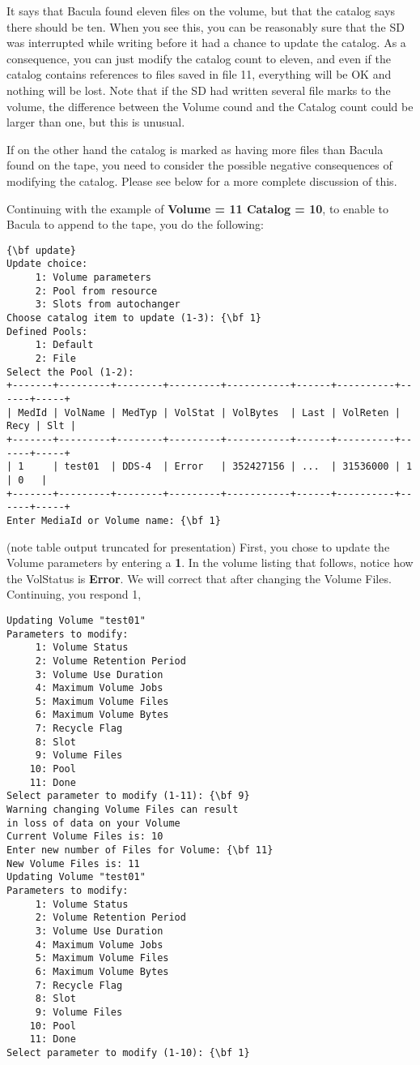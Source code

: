 It says that Bacula found eleven files on the volume, but that the catalog
says there should be ten. When you see this, you can be reasonably sure that
the SD was interrupted while writing before it had a chance to update the
catalog. As a consequence, you can just modify the catalog count to eleven,
and even if the catalog contains references to files saved in file 11,
everything will be OK and nothing will be lost. Note that if the SD had
written several file marks to the volume, the difference between the Volume
cound and the Catalog count could be larger than one, but this is unusual. 

If on the other hand the catalog is marked as having more files than Bacula
found on the tape, you need to consider the possible negative consequences of
modifying the catalog. Please see below for a more complete discussion of
this. 

Continuing with the example of {\bf Volume = 11 Catalog = 10}, to enable to
Bacula to append to the tape, you do the following: 

\footnotesize
\begin{verbatim}
{\bf update}
Update choice:
     1: Volume parameters
     2: Pool from resource
     3: Slots from autochanger
Choose catalog item to update (1-3): {\bf 1}
Defined Pools:
     1: Default
     2: File
Select the Pool (1-2):
+-------+---------+--------+---------+-----------+------+----------+------+-----+
| MedId | VolName | MedTyp | VolStat | VolBytes  | Last | VolReten | Recy | Slt |
+-------+---------+--------+---------+-----------+------+----------+------+-----+
| 1     | test01  | DDS-4  | Error   | 352427156 | ...  | 31536000 | 1    | 0   |
+-------+---------+--------+---------+-----------+------+----------+------+-----+
Enter MediaId or Volume name: {\bf 1}
\end{verbatim}
\normalsize

(note table output truncated for presentation) First, you chose to update the
Volume parameters by entering a {\bf 1}. In the volume listing that follows,
notice how the VolStatus is {\bf Error}. We will correct that after changing
the Volume Files. Continuing, you respond 1, 

\footnotesize
\begin{verbatim}
Updating Volume "test01"
Parameters to modify:
     1: Volume Status
     2: Volume Retention Period
     3: Volume Use Duration
     4: Maximum Volume Jobs
     5: Maximum Volume Files
     6: Maximum Volume Bytes
     7: Recycle Flag
     8: Slot
     9: Volume Files
    10: Pool
    11: Done
Select parameter to modify (1-11): {\bf 9}
Warning changing Volume Files can result
in loss of data on your Volume
Current Volume Files is: 10
Enter new number of Files for Volume: {\bf 11}
New Volume Files is: 11
Updating Volume "test01"
Parameters to modify:
     1: Volume Status
     2: Volume Retention Period
     3: Volume Use Duration
     4: Maximum Volume Jobs
     5: Maximum Volume Files
     6: Maximum Volume Bytes
     7: Recycle Flag
     8: Slot
     9: Volume Files
    10: Pool
    11: Done
Select parameter to modify (1-10): {\bf 1}
\end{verbatim}
\normalsize

